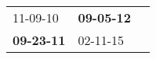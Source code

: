 \begin{supertabular}{p{0.33\columnwidth}p{0.33\columnwidth}p{0.33\columnwidth}}
          11-09-10\textsuperscript{} &  \textbf{09-05-12\textsuperscript{}} \\
 \textbf{09-23-11\textsuperscript{}} &           02-11-15\textsuperscript{} \\
\end{supertabular}
